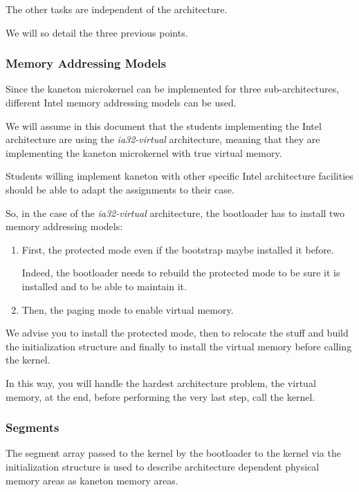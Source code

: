 The other tasks are independent of the architecture.

We will so detail the three previous points.

\subsubsection{Memory Addressing Models}

Since the kaneton microkernel can be implemented for three sub-architectures,
different Intel memory addressing models can be used.

We will assume in this document that the students implementing the
Intel architecture are using the \textit{ia32-virtual} architecture, meaning
that they are implementing the kaneton microkernel with true virtual memory.

Students willing implement kaneton with other specific Intel architecture
facilities should be able to adapt the assignments to their case.

So, in the case of the \textit{ia32-virtual} architecture, the bootloader
has to install two memory addressing models:

\begin{enumerate}
  \item
    First, the protected mode even if the bootstrap maybe installed it
    before.

    Indeed, the bootloader needs to rebuild the protected mode to be sure
    it is installed and to be able to maintain it.
  \item
    Then, the paging mode to enable virtual memory.
\end{enumerate}

We advise you to install the protected mode, then to relocate the stuff
and build the initialization structure and finally to install the
virtual memory before calling the kernel.

In this way, you will handle the hardest architecture problem, the virtual
memory, at the end, before performing the very last step, call the kernel.

\subsubsection{Segments}

The segment array passed to the kernel by the bootloader to the kernel via
the initialization structure is used to describe architecture dependent
physical memory areas as kaneton memory areas.


